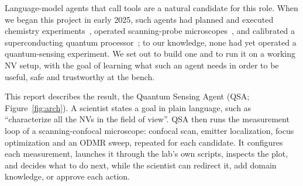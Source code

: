 \documentclass[10pt]{article}
\newcommand{\qsa}{QSA}
\begin{document}
Language-model agents that call tools are a natural candidate for this role.
When we began this project in early 2025, such agents had planned and executed chemistry experiments~\cite{boiko2023coscientist,bran2023chemcrow}, operated scanning-probe microscopes~\cite{liu2024microscopy,mandal2024aila}, and calibrated a superconducting quantum processor~\cite{cao2024kagents}; to our knowledge, none had yet operated a quantum-sensing experiment.
We set out to build one and to run it on a working NV setup, with the goal of learning what such an agent needs in order to be useful, safe and trustworthy at the bench.

This report describes the result, the Quantum Sensing Agent (\qsa{}; Figure~\ref{fig:arch}).
A scientist states a goal in plain language, such as ``characterize all the NVs in the field of view''.
\qsa{} then runs the measurement loop of a scanning-confocal microscope: confocal scan, emitter localization, focus optimization and an ODMR sweep, repeated for each candidate.
It configures each measurement, launches it through the lab's own scripts, inspects the plot, and decides what to do next, while the scientist can redirect it, add domain knowledge, or approve each action.

\end{document}
